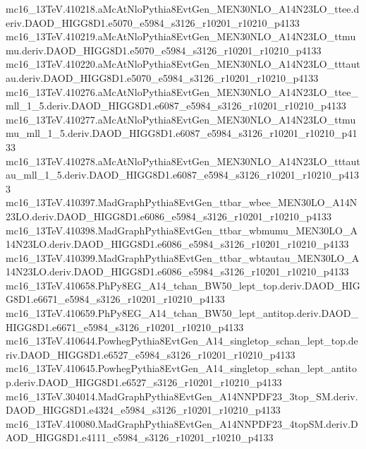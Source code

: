 \begin{scriptsize}
mc16\_13TeV.410218.aMcAtNloPythia8EvtGen\_MEN30NLO\_A14N23LO\_ttee.deriv.DAOD\_HIGG8D1.e5070\_e5984\_s3126\_r10201\_r10210\_p4133 \\
mc16\_13TeV.410219.aMcAtNloPythia8EvtGen\_MEN30NLO\_A14N23LO\_ttmumu.deriv.DAOD\_HIGG8D1.e5070\_e5984\_s3126\_r10201\_r10210\_p4133 \\
mc16\_13TeV.410220.aMcAtNloPythia8EvtGen\_MEN30NLO\_A14N23LO\_tttautau.deriv.DAOD\_HIGG8D1.e5070\_e5984\_s3126\_r10201\_r10210\_p4133 \\
mc16\_13TeV.410276.aMcAtNloPythia8EvtGen\_MEN30NLO\_A14N23LO\_ttee\_mll\_1\_5.deriv.DAOD\_HIGG8D1.e6087\_e5984\_s3126\_r10201\_r10210\_p4133 \\
mc16\_13TeV.410277.aMcAtNloPythia8EvtGen\_MEN30NLO\_A14N23LO\_ttmumu\_mll\_1\_5.deriv.DAOD\_HIGG8D1.e6087\_e5984\_s3126\_r10201\_r10210\_p4133 \\
mc16\_13TeV.410278.aMcAtNloPythia8EvtGen\_MEN30NLO\_A14N23LO\_tttautau\_mll\_1\_5.deriv.DAOD\_HIGG8D1.e6087\_e5984\_s3126\_r10201\_r10210\_p4133 \\
mc16\_13TeV.410397.MadGraphPythia8EvtGen\_ttbar\_wbee\_MEN30LO\_A14N23LO.deriv.DAOD\_HIGG8D1.e6086\_e5984\_s3126\_r10201\_r10210\_p4133 \\
mc16\_13TeV.410398.MadGraphPythia8EvtGen\_ttbar\_wbmumu\_MEN30LO\_A14N23LO.deriv.DAOD\_HIGG8D1.e6086\_e5984\_s3126\_r10201\_r10210\_p4133 \\
mc16\_13TeV.410399.MadGraphPythia8EvtGen\_ttbar\_wbtautau\_MEN30LO\_A14N23LO.deriv.DAOD\_HIGG8D1.e6086\_e5984\_s3126\_r10201\_r10210\_p4133 \\
mc16\_13TeV.410658.PhPy8EG\_A14\_tchan\_BW50\_lept\_top.deriv.DAOD\_HIGG8D1.e6671\_e5984\_s3126\_r10201\_r10210\_p4133 \\
mc16\_13TeV.410659.PhPy8EG\_A14\_tchan\_BW50\_lept\_antitop.deriv.DAOD\_HIGG8D1.e6671\_e5984\_s3126\_r10201\_r10210\_p4133 \\
mc16\_13TeV.410644.PowhegPythia8EvtGen\_A14\_singletop\_schan\_lept\_top.deriv.DAOD\_HIGG8D1.e6527\_e5984\_s3126\_r10201\_r10210\_p4133 \\
mc16\_13TeV.410645.PowhegPythia8EvtGen\_A14\_singletop\_schan\_lept\_antitop.deriv.DAOD\_HIGG8D1.e6527\_s3126\_r10201\_r10210\_p4133 \\
mc16\_13TeV.304014.MadGraphPythia8EvtGen\_A14NNPDF23\_3top\_SM.deriv.DAOD\_HIGG8D1.e4324\_e5984\_s3126\_r10201\_r10210\_p4133 \\
mc16\_13TeV.410080.MadGraphPythia8EvtGen\_A14NNPDF23\_4topSM.deriv.DAOD\_HIGG8D1.e4111\_e5984\_s3126\_r10201\_r10210\_p4133 \\

\end{scriptsize}
